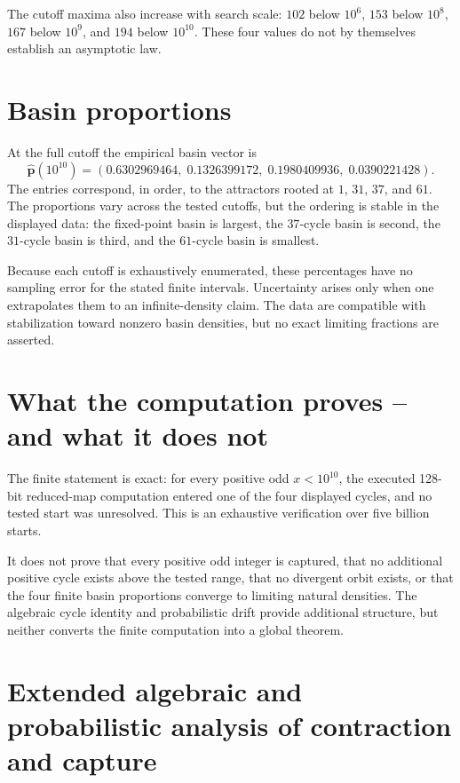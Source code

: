 \documentclass[11pt]{article}
\begin{document}
The cutoff maxima also increase with search scale: $102$ below $10^6$, $153$ below $10^8$, $167$ below $10^9$, and $194$ below $10^{10}$. These four values do not by themselves establish an asymptotic law.

\section{Basin proportions}
At the full cutoff the empirical basin vector is
\begin{equation}
\widehat{\mathbf p}(10^{10})=(0.6302969464,\;0.1326399172,\;0.1980409936,\;0.0390221428).
\end{equation}
The entries correspond, in order, to the attractors rooted at $1$, $31$, $37$, and $61$. The proportions vary across the tested cutoffs, but the ordering is stable in the displayed data: the fixed-point basin is largest, the $37$-cycle basin is second, the $31$-cycle basin is third, and the $61$-cycle basin is smallest.

Because each cutoff is exhaustively enumerated, these percentages have no sampling error for the stated finite intervals. Uncertainty arises only when one extrapolates them to an infinite-density claim. The data are compatible with stabilization toward nonzero basin densities, but no exact limiting fractions are asserted.

\section{What the computation proves -- and what it does not}
The finite statement is exact: for every positive odd $x<10^{10}$, the executed 128-bit reduced-map computation entered one of the four displayed cycles, and no tested start was unresolved. This is an exhaustive verification over five billion starts.

It does not prove that every positive odd integer is captured, that no additional positive cycle exists above the tested range, that no divergent orbit exists, or that the four finite basin proportions converge to limiting natural densities. The algebraic cycle identity and probabilistic drift provide additional structure, but neither converts the finite computation into a global theorem.

\section{Extended algebraic and probabilistic analysis of contraction and capture}
\end{document}
